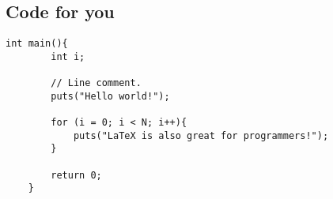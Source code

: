 
\subsection{Code for you}
\begin{lstlisting}[frame=single, caption={DemoCode},label=code::sttf]
    int main(){
        int i;

        // Line comment.
        puts("Hello world!");

        for (i = 0; i < N; i++){
            puts("LaTeX is also great for programmers!");
        }

        return 0;
    }
\end{lstlisting}